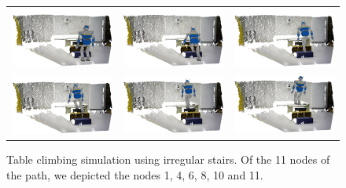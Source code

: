 \begin{figure}[!htb]
	\centering
	\renewcommand{\arraystretch}{0.2}
	\begin{tabular}{l c r}
	\includegraphics[width=.308\linewidth]{papers/RAM2013/pictures/Simu11Step0.png}&
	\includegraphics[width=.308\linewidth]{papers/RAM2013/pictures/Simu11Step3.png}&
	\includegraphics[width=.308\linewidth]{papers/RAM2013/pictures/Simu11Step5.png}\\
	\includegraphics[width=.308\linewidth]{papers/RAM2013/pictures/Simu11Step7.png}&
	\includegraphics[width=.308\linewidth]{papers/RAM2013/pictures/Simu11Step9.png}&
	\includegraphics[width=.308\linewidth]{papers/RAM2013/pictures/Simu11Step10.png}\\
	\end{tabular}
	\caption{Table climbing simulation using irregular stairs. Of the 11 nodes of the path, we depicted the nodes 1, 4, 6, 8, 10 and 11.}
	\label{fig:table-climbing-simulation-stair}
\end{figure}


